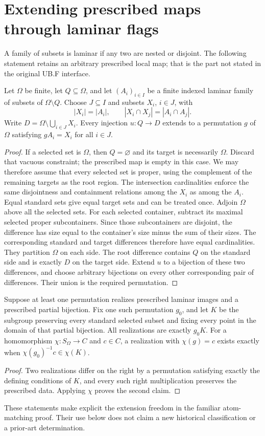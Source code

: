 \section{Extending prescribed maps through laminar flags}
A family of subsets is laminar if any two are nested or disjoint.
The following statement retains an arbitrary prescribed local map;
that is the part not stated in the original UB.F interface.

\begin{theorem}[UB.Laminar]\label{thm:laminar}
Let $\Omega$ be finite, let $Q\subseteq\Omega$, and let
$(A_i)_{i\in I}$ be a finite indexed laminar family of subsets of
$\Omega\setminus Q$. Choose $J\subseteq I$ and subsets $X_i$,
$i\in J$, with
\[
 |X_i|=|A_i|,\qquad |X_i\cap X_j|=|A_i\cap A_j|.
\]
Write $D=\Omega\setminus\bigcup_{i\in J}X_i$.
Every injection $u:Q\to D$ extends to a permutation $g$ of $\Omega$
satisfying $gA_i=X_i$ for all $i\in J$.
\end{theorem}
\begin{proof}
If a selected set is $\Omega$, then $Q=\varnothing$ and its target
is necessarily $\Omega$. Discard that vacuous constraint; the prescribed
map is empty in this case. We may therefore assume that every selected
set is proper, using the complement of the remaining targets as the
root region.
The intersection cardinalities enforce the same disjointness and
containment relations among the $X_i$ as among the $A_i$. Equal
standard sets give equal target sets and can be treated once. Adjoin
$\Omega$ above all the selected sets. For each selected container,
subtract its maximal selected proper subcontainers. Since those
subcontainers are disjoint, the difference has size equal to the
container's size minus the sum of their sizes. The corresponding
standard and target differences therefore have equal cardinalities.
They partition $\Omega$ on each side. The root difference contains
$Q$ on the standard side and is exactly $D$ on the target side.
Extend $u$ to a bijection of these two differences, and choose arbitrary
bijections on every other corresponding pair of differences. Their
union is the required permutation.
\end{proof}


\begin{lemma}[UB.Character]\label{lem:character}
Suppose at least one permutation realizes prescribed laminar images and
a prescribed partial bijection. Fix one such permutation $g_0$, and
let $K$ be the subgroup preserving every standard selected subset and
fixing every point in the domain of that partial bijection.
All realizations are exactly $g_0K$. For a homomorphism
$\chi:S_\Omega\to C$ and $c\in C$, a realization with $\chi(g)=c$
exists exactly when $\chi(g_0)^{-1}c\in\chi(K)$.
\end{lemma}
\begin{proof}
Two realizations differ on the right by a permutation satisfying exactly
the defining conditions of $K$, and every such right multiplication
preserves the prescribed data. Applying $\chi$ proves the second claim.
\end{proof}


These statements make explicit the extension freedom in the familiar atom-matching proof. Their use below does not claim a new historical classification or a prior-art determination.
